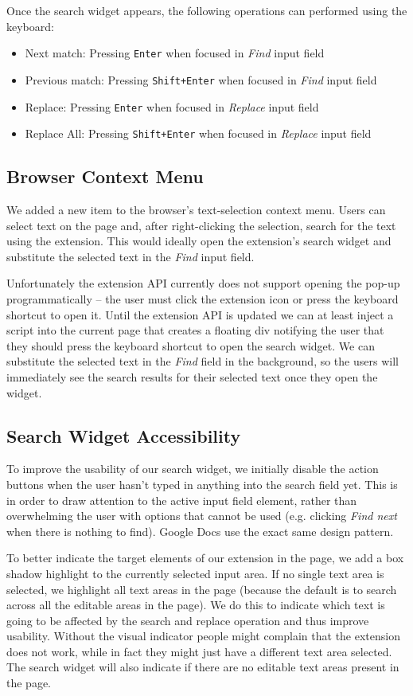 \documentclass[bsc,frontabs,twoside,singlespacing,parskip,deptreport]{infthesis}
\providecommand{\tightlist}{%
  \setlength{\itemsep}{0pt}\setlength{\parskip}{0pt}}
\begin{document}
Once the search widget appears, the following operations can performed using the keyboard:
\begin{itemize}
\tightlist
\item
  Next match: Pressing \texttt{Enter} when focused in \emph{Find} input field
\item
  Previous match: Pressing \texttt{Shift+Enter} when focused in \emph{Find} input field
\item
  Replace: Pressing \texttt{Enter} when focused in \emph{Replace} input field
\item
  Replace All: Pressing \texttt{Shift+Enter} when focused in \emph{Replace} input field
\end{itemize}

\subsection{Browser Context Menu}
We added a new item to the browser's text-selection context menu. Users can select text on the page and, after right-clicking the selection, search for the text using the extension. This would ideally open the extension's search widget and substitute the selected text in the \textit{Find} input field. 

Unfortunately the extension API currently does not support opening the pop-up programmatically \cite{A19} -- the user must click the extension icon or press the keyboard shortcut to open it. Until the extension API is updated we can at least inject a script into the current page that creates a floating div notifying the user that they should press the keyboard shortcut to open the search widget. We can substitute the selected text in the \textit{Find} field in the background, so the users will immediately see the search results for their selected text once they open the widget.

\subsection{Search Widget Accessibility}
To improve the usability of our search widget, we initially disable the action buttons when the user hasn't typed in anything into the search field yet. This is in order to draw attention to the active input field element, rather than overwhelming the user with options that cannot be used (e.g. clicking \textit{Find next} when there is nothing to find). Google Docs use the exact same design pattern. 

To better indicate the target elements of our extension in the page, we add a box shadow highlight to the currently selected input area. If no single text area is selected, we highlight all text areas in the page (because the default is to search across all the editable areas in the page). We do this to indicate which text is going to be affected by the search and replace operation and thus improve usability. Without the visual indicator people might complain that the extension does not work, while in fact they might just have a different text area selected. The search widget will also indicate if there are no editable text areas present in the page.
\end{document}
